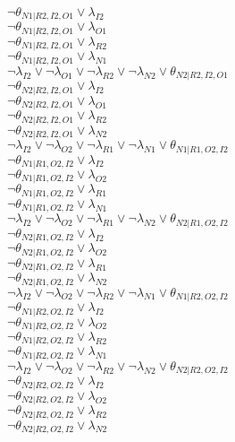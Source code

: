 $\neg\theta_{N1|R2,I2,O1} \vee \lambda_{I2}$\\
$\neg\theta_{N1|R2,I2,O1} \vee \lambda_{O1}$\\
$\neg\theta_{N1|R2,I2,O1} \vee \lambda_{R2}$\\
$\neg\theta_{N1|R2,I2,O1} \vee \lambda_{N1}$\\
$\neg\lambda_{I2} \vee \neg\lambda_{O1} \vee \neg\lambda_{R2} \vee \neg\lambda_{N2} \vee \theta_{N2|R2,I2,O1}$\\
$\neg\theta_{N2|R2,I2,O1} \vee \lambda_{I2}$\\
$\neg\theta_{N2|R2,I2,O1} \vee \lambda_{O1}$\\
$\neg\theta_{N2|R2,I2,O1} \vee \lambda_{R2}$\\
$\neg\theta_{N2|R2,I2,O1} \vee \lambda_{N2}$\\
$\neg\lambda_{I2} \vee \neg\lambda_{O2} \vee \neg\lambda_{R1} \vee \neg\lambda_{N1} \vee \theta_{N1|R1,O2,I2}$\\
$\neg\theta_{N1|R1,O2,I2} \vee \lambda_{I2}$\\
$\neg\theta_{N1|R1,O2,I2} \vee \lambda_{O2}$\\
$\neg\theta_{N1|R1,O2,I2} \vee \lambda_{R1}$\\
$\neg\theta_{N1|R1,O2,I2} \vee \lambda_{N1}$\\
$\neg\lambda_{I2} \vee \neg\lambda_{O2} \vee \neg\lambda_{R1} \vee \neg\lambda_{N2} \vee \theta_{N2|R1,O2,I2}$\\
$\neg\theta_{N2|R1,O2,I2} \vee \lambda_{I2}$\\
$\neg\theta_{N2|R1,O2,I2} \vee \lambda_{O2}$\\
$\neg\theta_{N2|R1,O2,I2} \vee \lambda_{R1}$\\
$\neg\theta_{N2|R1,O2,I2} \vee \lambda_{N2}$\\
$\neg\lambda_{I2} \vee \neg\lambda_{O2} \vee \neg\lambda_{R2} \vee \neg\lambda_{N1} \vee \theta_{N1|R2,O2,I2}$\\
$\neg\theta_{N1|R2,O2,I2} \vee \lambda_{I2}$\\
$\neg\theta_{N1|R2,O2,I2} \vee \lambda_{O2}$\\
$\neg\theta_{N1|R2,O2,I2} \vee \lambda_{R2}$\\
$\neg\theta_{N1|R2,O2,I2} \vee \lambda_{N1}$\\
$\neg\lambda_{I2} \vee \neg\lambda_{O2} \vee \neg\lambda_{R2} \vee \neg\lambda_{N2} \vee \theta_{N2|R2,O2,I2}$\\
$\neg\theta_{N2|R2,O2,I2} \vee \lambda_{I2}$\\
$\neg\theta_{N2|R2,O2,I2} \vee \lambda_{O2}$\\
$\neg\theta_{N2|R2,O2,I2} \vee \lambda_{R2}$\\
$\neg\theta_{N2|R2,O2,I2} \vee \lambda_{N2}$\\
